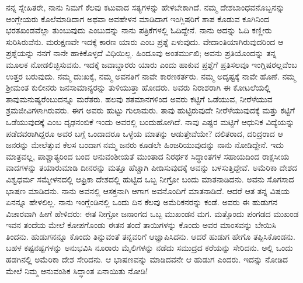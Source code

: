 ನನ್ನ ಸ್ನೇಹಿತರೇ, ನಾನು ನಿಮಗೆ ಕೆಲವು ಕಟುವಾದ ಸತ್ಯಗಳನ್ನು ಹೇಳಬೇಕಾಗಿದೆ. ನಮ್ಮ ದೇಶಬಾಂಧವನೊಬ್ಬನನ್ನು ಆಂಗ್ಲೇಯರು ಕೊಲೆಮಾಡಿದಾಗ ಅಥವಾ ಅವಹೇಳನ ಮಾಡಿದಾಗ ಇಂಗ್ಲಿಷರಿಗೆ ಶಾಪ ಕೊಡುವ ಕೂಗಿನಿಂದ ಭರತಖಂಡವೆಲ್ಲಾ ತುಂಬುವುದು ಎಂಬುದನ್ನು ನಾನು ಪತ್ರಿಕೆಗಳಲ್ಲಿ ಓದಿದ್ದೇನೆ. ನಾನು ಅದನ್ನು ಓದಿ ಕಣ್ಣೀರು ಸುರಿಸಿರುವೆನು. ಮರುಕ್ಷಣವೇ ಇದಕ್ಕೆ ಕಾರಣ ಯಾರು ಎಂಬ ಪ್ರಶ್ನೆ ಏಳುವುದು. ವೇದಾಂತಿಯಾಗಿರುವುದರಿಂದ ಆ ಪ್ರಶ್ನೆಯನ್ನು ನನಗೆ ನಾನೇ ಹಾಕಿಕೊಳ್ಳದೆ ವಿಧಿಯಿಲ್ಲ. ಹಿಂದೂವು ಅಂತರ್ಮುಖಿ; ಅವನು ಪ್ರತಿಯೊಂದನ್ನು ತನ್ನ ಮೂಲಕ ನೋಡಲಿಚ್ಛಿಸುವನು. ಇದಕ್ಕೆ ಜವಾಬ್ದಾರರು ಯಾರು ಎಂದು ಹಾಕುವ ಪ್ರಶ್ನೆಗೆ ಪ್ರತಿಸಲವೂ ಇಂಗ್ಲಿಷರಲ್ಲವೆಂಬ ಉತ್ತರ ಬರುವುದು. ನಮ್ಮ ದುಃಖಕ್ಕೆ, ನಮ್ಮ ಅವನತಿಗೆ ನಾವೇ ಕಾರಣಕರ್ತರು. ನಮ್ಮ ಅದೃಷ್ಟಕ್ಕೆ ನಾವೇ ಹೊಣೆ. ನಮ್ಮ ಶ‍್ರೀಮಂತ ಕುಲೀನರು ಜನಸಾಮಾನ್ಯರನ್ನು ತುಳಿಯುತ್ತಾ ಹೋದರು. ಅವರು ನಿರಾಶರಾಗಿ ಈ ಕೋಟಲೆಯಲ್ಲಿ ತಾವು\break ಮನುಷ್ಯರೆಂಬುದನ್ನೂ ಮರೆತರು. ಹಲವು ಶತಮಾನಗಳಿಂದ ಅವರು ಕಟ್ಟಿಗೆ ಒಡೆಯುವ, ನೀರೆಳೆಯುವ ಶ್ರಮಜೀವಿಗಳಾಗಿರುವರು. ಈಗ ಅವರು ಹುಟ್ಟು ಗುಲಾಮರು. ತಾವು ಹುಟ್ಟಿರುವುದೇ ನೀರೆಳೆಯುವುದಕ್ಕೆ ಮತ್ತು ಕಟ್ಟಿಗೆ ಒಡೆಯುವುದಕ್ಕೆ ಎಂಬ ದೃಢನಂಬಿಕೆ ಇಂದು ಅವರಲ್ಲಿ ಬಂದುಹೋಗಿದೆ. ನಾವು ಎಷ್ಟರ ಮಟ್ಟಿಗೆ ಆಧುನಿಕ ವಿದ್ಯೆಯನ್ನು ಪಡೆದವರಾಗಿದ್ದರೂ ಅವರ ಬಗ್ಗೆ ಒಂದಾದರೂ ಒಳ್ಳೆಯ ಮಾತನ್ನು ಆಡುತ್ತೇವೆಯೇ? ದಲಿತರಾದ, ದರಿದ್ರರಾದ ಆ ಜನರನ್ನು ಮೇಲೆತ್ತುವ ಕೆಲಸ ಬಂದಾಗ ನಮ್ಮ ಜನರು ಕೂಡಲೇ ಹಿಂಜರಿಯುವುದನ್ನು ನಾನು ನೋಡಿದ್ದೇನೆ. ಇದು ಮಾತ್ರವಲ್ಲ, ಪಾಶ್ಚಾತ್ಯರಿಂದ ಬಂದ ಆನುವಂಶೀಯತೆ ಮುಂತಾದ ನಿರರ್ಥಕ ಸಿದ್ಧಾಂತಗಳ ಸಹಾಯದಿಂದ ರಾಕ್ಷಸೀಯ ವಾದಗಳನ್ನು ತಯಾರುಮಾಡಿ ದೀನರನ್ನು ಮತ್ತೂ ಹೆಚ್ಚಾಗಿ ಪೀಡಿಸುವುದಕ್ಕೆ ಅವನ್ನು ಬಳಸುತ್ತಿದ್ದೇವೆ. ಅಮೆರಿಕಾ ದೇಶದ ವಿಶ್ವಧರ್ಮ ಸಮ್ಮೇಳನದಲ್ಲಿ ಆಫ್ರಿಕಾ ದೇಶದಲ್ಲಿ ಹುಟ್ಟಿದ ಒಬ್ಬ ನೀಗ್ರೋ ಬಂದು ಮಾತನಾಡಿದನು. ಅವನು ಸೊಗಸಾದ ಭಾಷಣ ಮಾಡಿದನು. ನಾನು ಅವನಲ್ಲಿ ಆಸಕ್ತನಾಗಿ ಆಗಾಗ ಅವನೊಂದಿಗೆ ಮಾತನಾಡಿದೆ. ಆದರೆ ಆತ ತನ್ನ ವಿಷಯ ಏನನ್ನೂ ಹೇಳಲಿಲ್ಲ. ನಾನು ಇಂಗ್ಲೆಂಡಿನಲ್ಲಿ ಒಂದು ದಿನ ಕೆಲವು ಅಮೆರಿಕನರನ್ನು ಕಂಡೆ. ಅವರು ಈ ಹುಡುಗನ ವಿಚಾರವಾಗಿ ಹೀಗೆ ಹೇಳಿದರು: ಈತ ನೀಗ್ರೋ ಜನಾಂಗದ ಒಬ್ಬ ಮುಖಂಡನ ಮಗ. ಮತ್ತೊಂದು ಪಂಗಡದ ಮುಖಂಡ ಇವನ ತಂದೆಯ ಮೇಲೆ ಕೋಪಗೊಂಡು ಈತನ ತಂದೆ ತಾಯಿಗಳನ್ನು ಕೊಂದು ಅವರ ಮಾಂಸವನ್ನು ಬೇಯಿಸಿ ತಿಂದನು. ಹುಡುಗನನ್ನೂ ಕೊಂದು ತಿನ್ನುವಂತೆ ತನ್ನವರಿಗೆ ಆಜ್ಞಾಪಿಸಿದನು. ಆದರೆ ಹುಡುಗ ಹೇಗೊ ತಪ್ಪಿಸಿಕೊಂಡನು. ಬಹಳ ಕಷ್ಟನಷ್ಟಗಳನ್ನು ಅನುಭವಿಸಿ ನೂರಾರು ಮೈಲಿಗಳನ್ನು ನಡೆದು ಸಮುದ್ರದ ಕರೆಯನ್ನು ಸೇರಿದನು. ಅಲ್ಲಿ ಒಂದು ಹಡಗಿನಲ್ಲಿ ಅಮೆರಿಕಾ ದೇಶ ಸೇರಿದನು. ಆ ಭಾಷಣವನ್ನು ಮಾಡಿದವನೇ ಆ ಹುಡುಗ ಎಂದರು. ಇದನ್ನು ನೋಡಿದ ಮೇಲೆ ನಿಮ್ಮ ಆನುವಂಶಿಕ ಸಿದ್ಧಾಂತ ಏನಾಯಿತು ನೋಡಿ!

